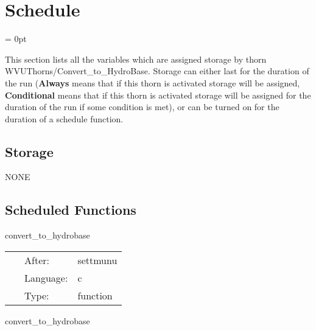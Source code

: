 
\section{Schedule} 


\parskip = 0pt


\noindent This section lists all the variables which are assigned storage by thorn WVUThorns/Convert\_to\_HydroBase.  Storage can either last for the duration of the run ({\bf Always} means that if this thorn is activated storage will be assigned, {\bf Conditional} means that if this thorn is activated storage will be assigned for the duration of the run if some condition is met), or can be turned on for the duration of a schedule function.


\subsection*{Storage}NONE
\subsection*{Scheduled Functions}
\vspace{5mm}


\hspace{5mm} convert\_to\_hydrobase 

\hspace{5mm}{\it convert illinoisgrmhd-native variables to hydrobase } 


\hspace{5mm}

 \begin{tabular*}{160mm}{cll} 
~ & After:  & settmunu \\ 
~ & Language:  & c \\ 
~ & Type:  & function \\ 
\end{tabular*} 


\vspace{5mm}


\hspace{5mm} convert\_to\_hydrobase 

\hspace{5mm}{\it convert illinoisgrmhd-native variables to hydrobase } 


\hspace{5mm}

